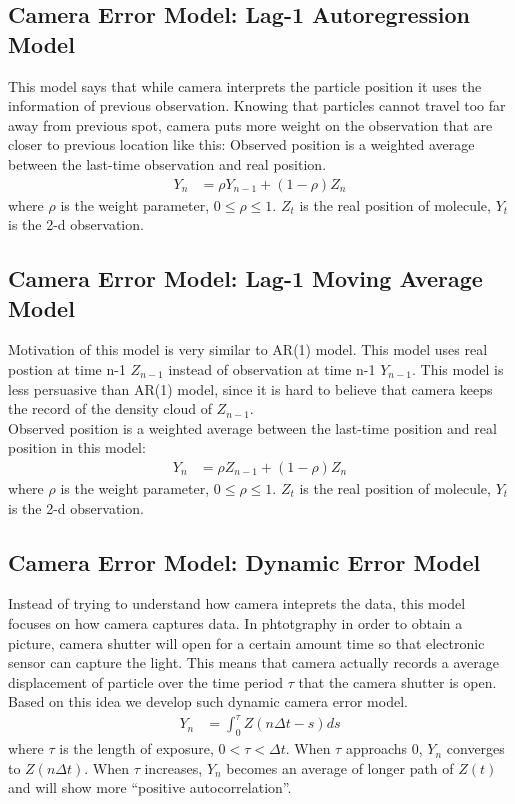 \documentclass[12pt,letterpaper]{article}\usepackage[]{graphicx}\usepackage[]{color}
\theoremstyle{definition}\newtheorem*{conject}{Conjecture}
\newcommand{\dt}{\Delta t}
\begin{document}
\subsection{Camera Error Model: Lag-1 Autoregression Model}
This model says that while camera interprets the particle position it uses the information of previous observation. Knowing that particles cannot travel too far away from previous spot, camera puts more weight on the observation that are closer to previous location like this:
Observed position is a weighted average between the last-time observation and real position. 
\begin{align*}
	Y_n &= \rho Y_{n-1} + (1-\rho)Z_n 
\end{align*}
where $\rho$ is the weight parameter, $0 \leq \rho \leq 1$. $Z_t$ is the real position of molecule, $Y_t$ is the 2-d observation.

\subsection{Camera Error Model: Lag-1 Moving Average Model}
Motivation of this model is very similar to AR(1) model. This model uses real postion at time n-1 $Z_{n-1}$ instead of observation at time n-1 $Y_{n-1}$. This model is less persuasive than AR(1) model, since it is hard to believe that camera keeps the record of the density cloud of $Z_{n-1}$.\\
Observed position is a weighted average between the last-time position and real position in this model:
\begin{align*}
	Y_n &= \rho Z_{n-1} + (1-\rho) Z_n 
\end{align*}
where $\rho$ is the weight parameter, $0 \leq \rho \leq 1$. $Z_t$ is the real position of molecule, $Y_t$ is the 2-d observation.

\subsection{Camera Error Model: Dynamic Error Model}
Instead of trying to understand how camera inteprets the data, this model focuses on how camera captures data. In phtotgraphy in order to obtain a picture, camera shutter will open for a certain amount time so that electronic sensor can capture the light. This means that camera actually records a average displacement of particle over the time period $\tau$ that the camera shutter is open. Based on this idea we develop such dynamic camera error model.
\begin{align*}
	Y_n&= \int_{0}^{\tau}Z(n\dt-s) ds
\end{align*}
where $\tau$ is the length of exposure, $0 < \tau < \dt$. When $\tau$ approachs 0, $Y_n$ converges to $Z(n\dt)$. When $\tau$ increases, $Y_n$ becomes an average of longer path of $Z(t)$ and will show more ``positive autocorrelation''.
\end{document}
